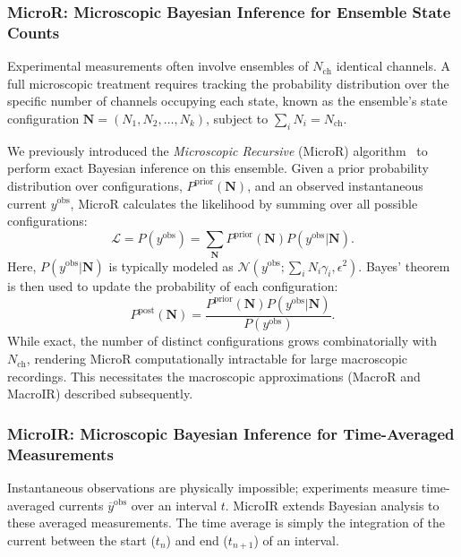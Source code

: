 \documentclass[9pt]{elife}
\begin{document}
\subsubsection{MicroR: Microscopic Bayesian Inference for Ensemble State Counts}
Experimental measurements often involve ensembles of \(N_{\text{ch}}\) identical channels. A full microscopic treatment requires tracking the probability distribution over the specific number of channels occupying each state, known as the ensemble's state configuration \( \boldsymbol{N} = (N_1, N_2, \dots, N_k) \), subject to \( \sum_i N_i = N_{\text{ch}} \).

We previously introduced the \textit{Microscopic Recursive} (MicroR) algorithm~\cite{Moffatt} to perform exact Bayesian inference on this ensemble. Given a prior probability distribution over configurations, \( P^{\text{prior}}(\boldsymbol{N}) \), and an observed instantaneous current \(y^{\text{obs}}\), MicroR calculates the likelihood by summing over all possible configurations:
\begin{equation}
	\mathcal{L} = P(y^{\text{obs}}) = \sum_{\boldsymbol{N}} P^{\text{prior}}(\boldsymbol{N}) P(y^{\text{obs}} | \boldsymbol{N}).
	\label{eq:microR_likelihood}
\end{equation}
Here, \( P(y^{\text{obs}} | \boldsymbol{N}) \) is typically modeled as \( \mathcal{N}(y^{\text{obs}}; \sum_i N_i \gamma_i, \epsilon^2) \). Bayes' theorem is then used to update the probability of each configuration:
\begin{equation}
	P^{\text{post}}(\boldsymbol{N}) = \frac{ P^{\text{prior}}(\boldsymbol{N}) P(y^{\text{obs}} | \boldsymbol{N})}{P(y^{\text{obs}})}.
	\label{eq:microR_posterior}
\end{equation}
While exact, the number of distinct configurations grows combinatorially with \( N_{\text{ch}} \), rendering MicroR computationally intractable for large macroscopic recordings. This necessitates the macroscopic approximations (MacroR and MacroIR) described subsequently.

\subsubsection{MicroIR: Microscopic Bayesian Inference for Time-Averaged Measurements}
Instantaneous observations are physically impossible; experiments measure time-averaged currents \(\overline{y}^{\text{obs}}\) over an interval \(t\). MicroIR extends Bayesian analysis to these averaged measurements. The time average is simply the integration of the current between the start ($t_n$) and end ($t_{n+1}$) of an interval.
\end{document}
